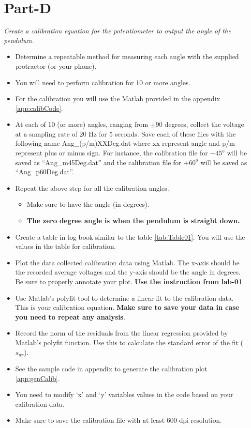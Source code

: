 \documentclass{article} %
\begin{document}
\section{Part-D}
\emph{Create a calibration equation for the potentiometer to output the angle of the pendulum.}
\begin{itemize}
\item Determine a repeatable method for measuring each angle with the supplied protractor (or your phone). 
\item You will need to perform calibration for 10 or more angles. 
\item For the calibration you will use the Matlab provided in the appendix \ref{app:calibCode}. 
\item At each of 10 (or more) angles, ranging from $\pm$90 degrees, collect the voltage at a sampling rate of 20 Hz for 5 seconds. Save each of these files with the following name Ang\_(p/m)XXDeg.dat where xx represent angle and p/m represent plus or minus sign. For instance, the calibration file for $-45^o$ will be saved as ``Ang\_m45Deg.dat'' and  the calibration file for $+60^o$ will be saved as ``Ang\_p60Deg.dat''.
\item Repeat the above step for all the calibration angles. 
\begin{itemize}
	\item Make sure to have the angle (in degrees). 
	\item {\bf The zero degree angle is when the pendulum is straight down.}
\end{itemize}
\item Create a table in log book similar to the table \ref{tab:Table01}. You will use the values in the table for calibration.
\item Plot the data collected calibration data using Matlab. The x-axis should be the recorded average voltages and the y-axis should be the angle in degrees. Be sure to properly annotate your plot. \textbf{Use the instruction from lab-01}
\item Use Matlab’s polyfit tool to determine a linear fit to the calibration data. This is your calibration equation. \textbf {Make sure to save your data in case you need to repeat any analysis}.
\item Record the norm of the residuals from the linear regression provided by Matlab’s polyfit function. Use this to calculate the standard error of the fit ($s_{yx}$).
\item See the sample code in appendix to generate the calibration plot \ref{app:genCalib}.
\item You need to modify `x' and `y' variables values in the code based on your calibration data.
\item Make sure to save the calibration file with at least 600 dpi resolution.
\end{itemize}
\end{document}
